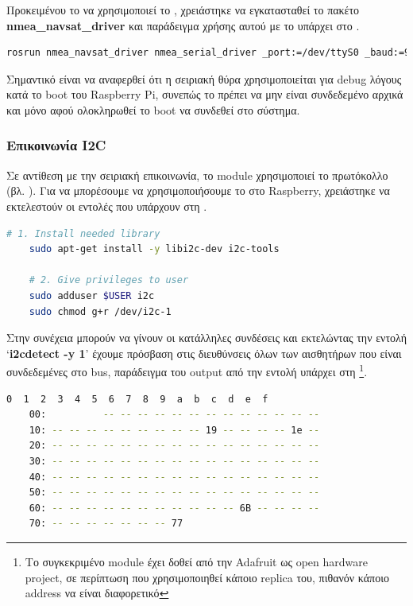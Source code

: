 Προκειμένου το  να χρησιμοποιεί το , χρειάστηκε να εγκατασταθεί το πακέτο \textbf{nmea\_navsat\_driver} \cite{nmea-navsat-driver} και παράδειγμα χρήσης αυτού με το  υπάρχει στο .  

\begin{lstlisting}[language=bash, escapechar=@, caption={GPS - ROS sample usage},label=list:gps-ros-sample-usage]
    rosrun nmea_navsat_driver nmea_serial_driver _port:=/dev/ttyS0 _baud:=9600 
\end{lstlisting}

Σημαντικό είναι να αναφερθεί ότι η σειριακή θύρα χρησιμοποιείται για debug λόγους κατά το boot
του Raspberry Pi, συνεπώς το  πρέπει να μην είναι συνδεδεμένο αρχικά και μόνο αφού ολοκληρωθεί το boot να συνδεθεί στο σύστημα.

\subsubsection{Επικοινωνία I2C}
Σε αντίθεση με την σειριακή επικοινωνία, το  module χρησιμοποιεί το  πρωτόκολλο (βλ. ).
Για να μπορέσουμε να χρησιμοποιήσουμε το  στο Raspberry, χρειάστηκε να εκτελεστούν οι εντολές που υπάρχουν στη .

\begin{lstlisting}[language=bash, escapechar=@, caption={Fix I2C communication},label=list:fix-I2C-communication]
    # 1. Install needed library
    sudo apt-get install -y libi2c-dev i2c-tools 

    # 2. Give privileges to user
    sudo adduser $USER i2c
    sudo chmod g+r /dev/i2c-1
\end{lstlisting}

Στην συνέχεια μπορούν να γίνουν οι κατάλληλες συνδέσεις και εκτελώντας την ε\-ντο\-λή `\textbf{i2cdetect -y 1}' έχουμε πρόσβαση στις διευθύνσεις όλων των αισθητήρων που είναι συνδεδεμένες στο  bus, παράδειγμα του output από την εντολή υπάρχει στη \footnote{Το συγκεκριμένο module έχει δοθεί από την Adafruit ως open hardware project, σε περίπτωση που χρησιμοποιηθεί κάποιο replica του, πιθανόν κάποιο address να είναι διαφορετικό}.

\begin{lstlisting}[language=bash, escapechar=@, caption={I2C addressed output example},label=list:I2C-output]
    0  1  2  3  4  5  6  7  8  9  a  b  c  d  e  f
    00:          -- -- -- -- -- -- -- -- -- -- -- -- -- 
    10: -- -- -- -- -- -- -- -- -- 19 -- -- -- -- 1e -- 
    20: -- -- -- -- -- -- -- -- -- -- -- -- -- -- -- -- 
    30: -- -- -- -- -- -- -- -- -- -- -- -- -- -- -- -- 
    40: -- -- -- -- -- -- -- -- -- -- -- -- -- -- -- -- 
    50: -- -- -- -- -- -- -- -- -- -- -- -- -- -- -- -- 
    60: -- -- -- -- -- -- -- -- -- -- -- 6B -- -- -- -- 
    70: -- -- -- -- -- -- -- 77       
\end{lstlisting}


